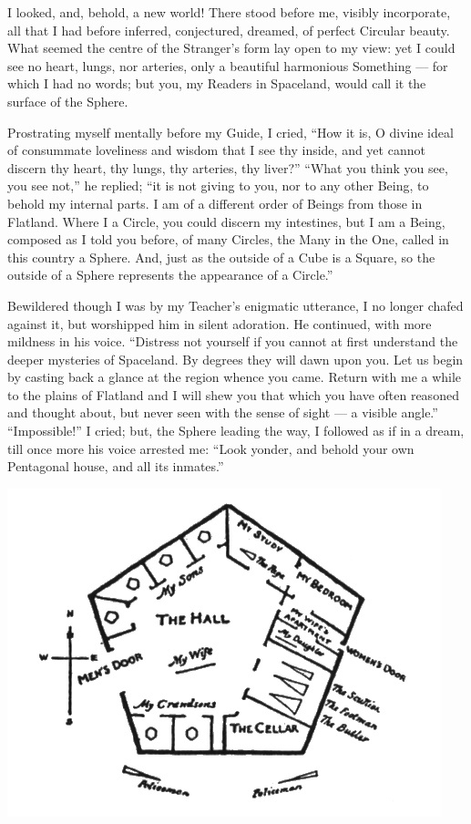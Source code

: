 \documentclass[10pt, kindle, oneside]{kindle}
\begin{document}
I looked, and, behold, a new world! There stood before me, visibly
incorporate, all that I had before inferred, conjectured, dreamed, of perfect
Circular beauty. What seemed the centre of the Stranger's form lay open to my
view: yet I could see no heart, lungs, nor arteries, only a beautiful
harmonious Something --- for which I had no words; but you, my Readers in
Spaceland, would call it the surface of the Sphere.

Prostrating myself mentally before my Guide, I cried, ``How it is, O divine
ideal of consummate loveliness and wisdom that I see thy inside, and yet
cannot discern thy heart, thy lungs, thy arteries, thy liver?'' ``What you think
you see, you see not,'' he replied; ``it is not giving to you, nor to any other
Being, to behold my internal parts. I am of a different order of Beings from
those in Flatland. Where I a Circle, you could discern my intestines, but I am
a Being, composed as I told you before, of many Circles, the Many in the One,
called in this country a Sphere. And, just as the outside of a Cube is a
Square, so the outside of a Sphere represents the appearance of a Circle.''

Bewildered though I was by my Teacher's enigmatic utterance, I no longer
chafed against it, but worshipped him in silent adoration. He continued, with
more mildness in his voice. ``Distress not yourself if you cannot at first
understand the deeper mysteries of Spaceland. By degrees they will dawn upon
you. Let us begin by casting back a glance at the region whence you came.
Return with me a while to the plains of Flatland and I will shew you that
which you have often reasoned and thought about, but never seen with the sense
of sight --- a visible angle.'' ``Impossible!'' I cried; but, the Sphere leading
the way, I followed as if in a dream, till once more his voice arrested me:
``Look yonder, and behold your own Pentagonal house, and all its inmates.''
\begin{center}
    \includegraphics[trim=15mm 0mm 20mm 0mm,scale=0.5]{fig9}
\end{center}
\end{document}
